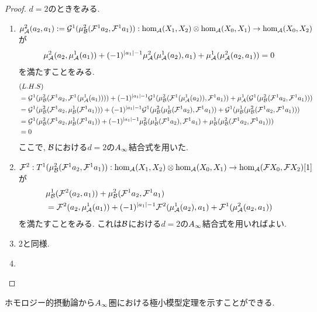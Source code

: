 \documentclass[uplatex, a4paper, 14Q, dvipdfmx]{jsarticle}
\begin{document}
\begin{proof}
  $d=2$のときをみる.
  \begin{enumerate}
    \item $\mu^2_\A(a_2,a_1) := \G^1 (\mu^2_\B(\F^1a_2, \F^1a_1)) : \hom_\A(X_1,X_2) \otimes \hom_\A(X_0,X_1) \to \hom_\A(X_0,X_2)$が
    \begin{align*}
      \mu^2_\A(a_2, \mu^1_\A(a_1)) + (-1)^{|a_1|-1} \mu^2_\A(\mu^1_\A(a_2), a_1) + \mu^1_\A(\mu^2_\A(a_2, a_1))
      = 0
    \end{align*}
    を満たすことをみる. 
  \begin{align*}
    &(L.H.S) \\
    &= \G^1 (\mu^2_\B(\F^1a_2, \F^1(\mu^1_\A(a_1)))) + (-1)^{|a_1|-1} \G^1 (\mu^2_\B(\F^1(\mu^1_\A(a_2)), \F^1a_1)) + \mu^1_\A(\G^1 (\mu^2_\B(\F^1a_2, \F^1a_1))) \\
    &= \G^1 (\mu^2_\B(\F^1a_2, \mu^1_\B(\F^1a_1))) + (-1)^{|a_1|-1} \G^1 (\mu^2_\B(\mu^1_\B(\F^1a_2), \F^1a_1)) + \G^1(\mu^1_\B (\mu^2_\B(\F^1a_2, \F^1a_1))) \\
    &= \G^1 (\mu^2_\B(\F^1a_2, \mu^1_\B(\F^1a_1)) + (-1)^{|a_1|-1} \mu^2_\B(\mu^1_\B(\F^1a_2), \F^1a_1) + \mu^1_\B (\mu^2_\B(\F^1a_2, \F^1a_1))) \\
    &= 0
  \end{align*}
  ここで, $\B$における$d=2$の$\Ainf$結合式を用いた.
  \item $\F^2 : T^1(\mu^2_\B(\F^1a_2, \F^1a_1)) : \hom_\A(X_1,X_2) \otimes \hom_\A(X_0,X_1) \to \hom_\A(\F X_0,\F X_2)[1]$が
  \begin{align*}
    &\mu^1_\B(\F^2(a_2,a_1)) + \mu^2_\B(\F^1a_2, \F^1a_1) \\
    &= \F^2(a_2,\mu^1_\A(a_1)) + (-1)^{|a_1|-1} \F^2(\mu^1_\A(a_2),a_1) + \F^1(\mu^2_\A(a_2,a_1))
  \end{align*}
  を満たすことをみる.
  これは$\B$における$d=2$の$\Ainf$結合式を用いればよい. 
  \item 2と同様. 
  \item 
  \end{enumerate}
\end{proof}

ホモロジー的摂動論から$\Ainf$圏における極小模型定理を示すことができる. 

  
\end{document}
